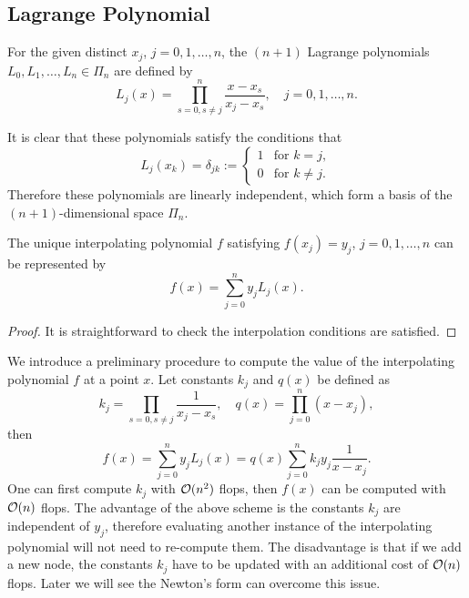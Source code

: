 \subsection{Lagrange Polynomial}
\begin{definition}
    For the given distinct $x_j$, $j = 0, 1, \dots, n$, the $(n+1)$ Lagrange polynomials $L_0, L_1,\dots, L_n\in\Pi_n$ are defined by 
    \begin{equation}
        L_j(x) = \prod_{s = 0, s\neq j}^n \frac{x - x_s}{x_j - x_s}, \quad j = 0, 1,\dots , n.
    \end{equation}
\end{definition}
It is clear that these polynomials satisfy the conditions that 
\begin{equation}
    L_j(x_k) = \delta_{jk} := \begin{cases}
        1&\text{for } k=j,\\
        0&\text{for } k\neq j.
    \end{cases}
\end{equation}
Therefore these polynomials are linearly independent, which form a basis of the $(n+ 1)$-dimensional space $\Pi_n$.
\begin{theorem}
\label{Thm: 2-Uni-Exi-Lag}
    The unique interpolating polynomial $f$ satisfying $f(x_j) = y_j$, $j=0,1,\dots, n$ can be represented by 
    \begin{equation}
        f(x) = \sum_{j=0}^n y_j L_j(x).
    \end{equation}
\end{theorem}
\begin{proof}
    It is straightforward to check the interpolation conditions are satisfied.
\end{proof}
\begin{remark}
    We introduce a preliminary procedure to compute the value of the interpolating polynomial $f$ at a point $x$. Let constants $k_j$ and $q(x)$ be defined as 
    \begin{equation}
        k_j = \prod_{s= 0, s\neq j}\frac{1}{x_j - x_s},\quad q(x) = \prod_{j=0}^n (x - x_j),
    \end{equation}
    then 
    \begin{equation}
        f(x) = \sum_{j=0}^n y_j L_j(x) = q(x)  \sum_{j=0}^n k_j y_j \frac{1}{x - x_j}.
    \end{equation}
    One can first compute $k_j$ with $\mathcal O(n^2)$ flops, then $f(x)$ can be computed with $\mathcal O(n)$ flops. The advantage of the above scheme is the constants $k_j$ are independent of $y_j$, therefore evaluating another instance of the interpolating polynomial will not need to re-compute them. The disadvantage is that if we add a new node, the constants $k_j$ have to be updated with an additional cost of $\mathcal O(n)$ flops. Later we will see the Newton's form can overcome this issue.
\end{remark}
